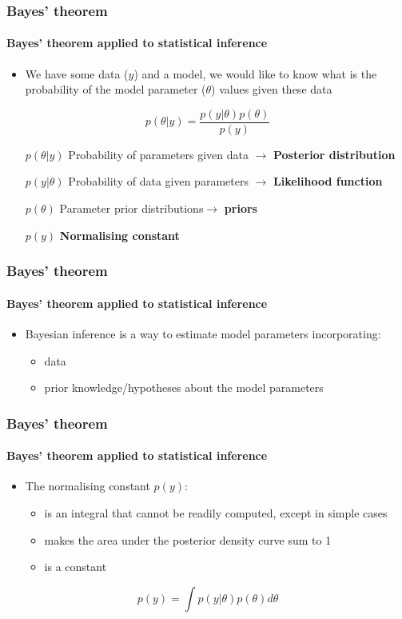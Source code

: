 \documentclass{beamer}
\begin{document}
\begin{frame}
\frametitle{Bayes’ theorem}
\framesubtitle{Bayes’ theorem applied to statistical inference}
 \begin{itemize}
  \item{We have some data ($y$) and a model, we would like to know what is the probability of the model parameter ($\theta$) values given these data}
 \end{itemize}
\begin{large}
$$p(\theta|y)=\frac{p(y|\theta)p(\theta)}{p(y)}$$
\end{large}
\begin{itemize}
 \item[$p(\theta|y)$]{Probability of parameters given data $\rightarrow$ \textbf{Posterior distribution}}
 \item[$p(y|\theta)$]{Probability of data given parameters $\rightarrow$ \textbf{Likelihood function}}
 \item[$p(\theta)$]{Parameter prior distributions$\rightarrow$ \textbf{priors}}
 \item[$p(y)$]{\textbf{Normalising constant}}
 \end{itemize}
\end{frame}

\begin{frame}
\frametitle{Bayes’ theorem}
\framesubtitle{Bayes’ theorem applied to statistical inference}
 \begin{itemize}
  \item{Bayesian inference is a way to estimate model parameters incorporating:}
 \begin{itemize}
  \item{data}
  \item{prior knowledge/hypotheses about the model parameters}
 \end{itemize}
\end{itemize}
\end{frame}

\begin{frame}
\frametitle{Bayes’ theorem}
\framesubtitle{Bayes’ theorem applied to statistical inference}
\begin{itemize}
 \item{The normalising constant $p(y)$:}
 \begin{itemize}
  \item{is an integral that cannot be readily computed, except in simple cases}
  \item{makes the area under the posterior density curve sum to 1}
  \item{is a constant}
 \end{itemize}
\end{itemize}
\vspace{.5cm}
\Large
$$p(y)=\int p(y|\theta)p(\theta)d\theta$$
\end{frame}
\end{document}
